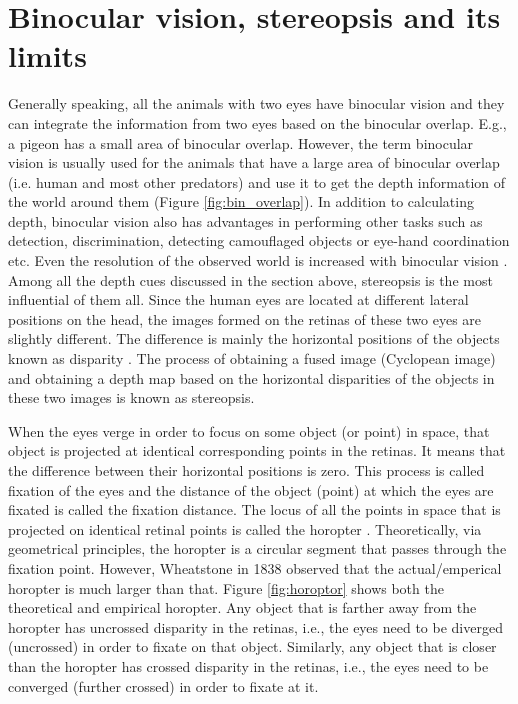 \section{Binocular vision, stereopsis and its limits}
Generally speaking, all the animals with two eyes have binocular vision and they can integrate the information from two eyes based on the binocular overlap. E.g., a pigeon has a small area of binocular overlap. However, the term binocular vision is usually used for the animals that have a large area of binocular overlap (i.e. human and most other predators) and use it to get the depth information of the world around them (Figure \ref{fig:bin_overlap}). In addition to calculating depth, binocular vision also has advantages in performing other tasks such as detection, discrimination, detecting camouflaged objects or eye-hand coordination etc. Even the resolution of the observed world is increased with binocular vision \cite{howard1995binocular}. Among all the depth cues discussed in the section above, stereopsis is the most influential of them all. Since the human eyes are located at different lateral positions on the head, the images formed on the retinas of these two eyes are slightly different. The difference is mainly the horizontal positions of the objects known as disparity \cite{ wiki:stereopsis}. The process of obtaining a fused image (Cyclopean image) and obtaining a depth map based on the horizontal disparities of the objects in these two images is known as stereopsis.

When the eyes verge in order to focus on some object (or point) in space, that object is projected at identical corresponding points in the retinas. It means that the difference between their horizontal positions is zero. This process is called fixation of the eyes and the distance of the object (point) at which the eyes are fixated is called the fixation distance. The locus of all the points in space that is projected on identical retinal points is called the horopter \cite{ wiki:horoptor}. Theoretically, via geometrical principles, the horopter is a circular segment that passes through the fixation point. However, Wheatstone in 1838 observed that the actual/emperical horopter is much larger than that. Figure \ref{fig:horoptor} shows both the theoretical and empirical horopter. Any object that is farther away from the horopter has uncrossed disparity in the retinas, i.e., the eyes need to be diverged (uncrossed) in order to fixate on that object. Similarly, any object that is closer than the horopter has crossed disparity in the retinas, i.e., the eyes need to be converged (further crossed) in order to fixate at it.

